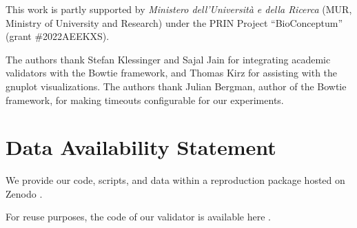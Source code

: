 This work is partly supported by \emph{Ministero dell'Università e della Ricerca} (MUR, Ministry of University and Research) under the PRIN Project ``BioConceptum'' (grant \#2022AEEKXS).
 
The authors thank Stefan Klessinger and Sajal Jain for integrating academic validators with the Bowtie framework, 
and Thomas Kirz for assisting with the gnuplot visualizations.
%
The authors thank Julian Bergman, author of the Bowtie framework, for making timeouts configurable for our experiments.

\section*{Data Availability Statement}

We provide our code, scripts, and data within a reproduction package hosted on Zenodo \citep{lyes_attouche_2023_10019663}.

For reuse purposes, the code of our validator is available here \citep{mjsvalidator}. 










\onecolumn



